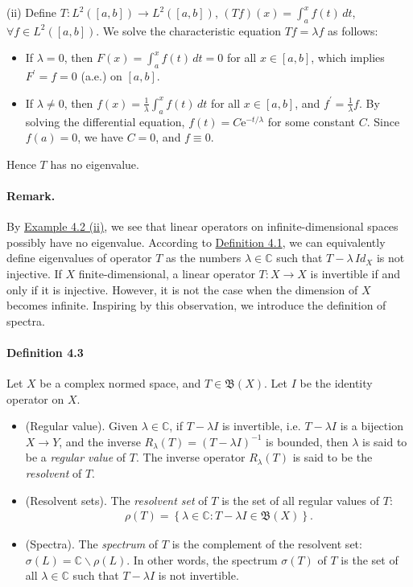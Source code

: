 \documentclass{article}
\begin{document}
(ii) Define $T:L^2([a,b])\to L^2([a,b])$, $(Tf)(x)=\int_a^x f(t)\,dt$, $\forall f\in L^2([a,b])$. We solve the characteristic equation $Tf=\lambda f$ as follows:
\begin{itemize}
	\vspace{0.1cm}
	\item If $\lambda=0$, then $F(x)=\int_a^x f(t)\,dt=0$ for all $x\in[a,b]$, which implies $F^\prime = f = 0$ (a.e.) on $[a,b]$.
	\vspace{0.1cm}
	\item If $\lambda\neq 0$, then $f(x)=\frac{1}{\lambda}\int_a^x f(t)\,dt$ for all $x\in[a,b]$, and $f^\prime = \frac{1}{\lambda}f$. By solving the differential equation, $f(t) = C\mathrm{e}^{-t/\lambda}$ for some constant $C$. Since $f(a)=0$, we have $C=0$, and $f\equiv 0$.\vspace{0.1cm}
\end{itemize}
Hence $T$ has no eigenvalue.

\paragraph{Remark.} By \hyperref[example:4.2]{Example 4.2 (ii)}, we see that linear operators on infinite-dimensional spaces possibly have no eigenvalue. According to \hyperref[def:4.1]{Definition 4.1}, we can equivalently define eigenvalues of operator $T$ as the numbers $\lambda\in\mathbb{C}$ such that $T-\lambda\,Id_X$ is not injective. If $X$ finite-dimensional, a linear operator $T:X\to X$ is invertible if and only if it is injective. However, it is not the case when the dimension of $X$ becomes infinite. Inspiring by this observation, we introduce the definition of spectra.

\paragraph{Definition 4.3 \label{def:4.3}} Let $X$ be a complex normed space, and $T\in\mathfrak{B}(X)$. Let $I$ be the identity operator on $X$.
\begin{itemize}
	\item[(i)] (Regular value). Given $\lambda\in\mathbb{C}$, if $T-\lambda I$ is invertible, i.e. $T-\lambda I$ is a bijection $X\to Y$, and the inverse $R_\lambda(T)=(T-\lambda I)^{-1}$ is bounded, then $\lambda$ is said to be a \textit{regular value} of $T$. The inverse operator $R_\lambda(T)$ is said to be the \textit{resolvent} of $T$.
	\item[(ii)] (Resolvent sets). The \textit{resolvent set} of $T$ is the set of all regular values of $T$:
	\begin{align*}
		\rho(T) = \left\{\lambda\in\mathbb{C}:T-\lambda I\in\mathfrak{B}(X)\right\}.
	\end{align*}
    \item[(iii)] (Spectra). The \textit{spectrum} of $T$ is the complement of the resolvent set: $\sigma(L)=\mathbb{C}\backslash\rho(L).$ In other words, the spectrum $\sigma(T)$ of $T$ is the set of all $\lambda\in\mathbb{C}$ such that $T-\lambda I$ is not invertible.
\end{itemize}
\end{document}
